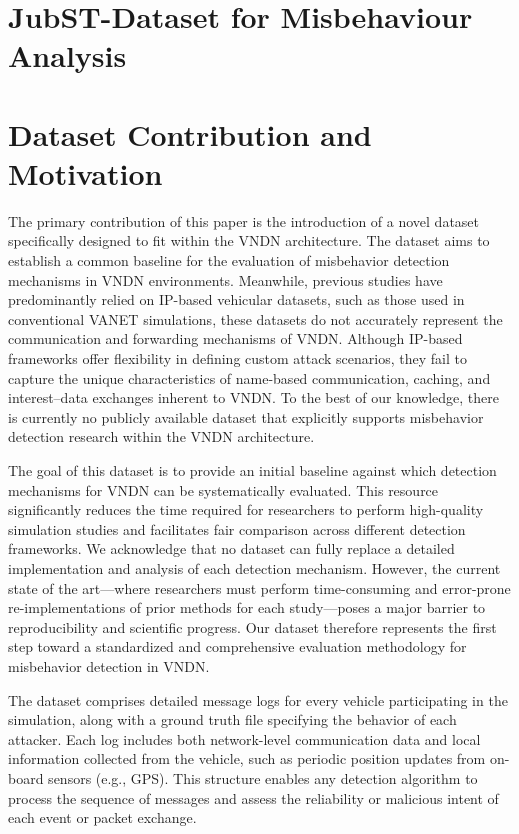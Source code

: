 \documentclass[journal,comsoc]{IEEEtran}
\begin{document}
\section{JubST-Dataset for Misbehaviour Analysis}
\section{Dataset Contribution and Motivation}

The primary contribution of this paper is the introduction of a novel dataset specifically designed to fit within the VNDN architecture. The dataset aims to establish a common baseline for the evaluation of misbehavior detection mechanisms in VNDN environments. Meanwhile, previous studies have predominantly relied on IP-based vehicular datasets, such as those used in conventional VANET simulations, these datasets do not accurately represent the communication and forwarding mechanisms of VNDN. Although IP-based frameworks offer flexibility in defining custom attack scenarios, they fail to capture the unique characteristics of name-based communication, caching, and interest–data exchanges inherent to VNDN. To the best of our knowledge, there is currently no publicly available dataset that explicitly supports misbehavior detection research within the VNDN architecture. 

The goal of this dataset is to provide an initial baseline against which detection mechanisms for VNDN can be systematically evaluated. This resource significantly reduces the time required for researchers to perform high-quality simulation studies and facilitates fair comparison across different detection frameworks. We acknowledge that no dataset can fully replace a detailed implementation and analysis of each detection mechanism. However, the current state of the art—where researchers must perform time-consuming and error-prone re-implementations of prior methods for each study—poses a major barrier to reproducibility and scientific progress. Our dataset therefore represents the first step toward a standardized and comprehensive evaluation methodology for misbehavior detection in VNDN.

The dataset comprises detailed message logs for every vehicle participating in the simulation, along with a ground truth file specifying the behavior of each attacker. Each log includes both network-level communication data and local information collected from the vehicle, such as periodic position updates from on-board sensors (e.g., GPS). This structure enables any detection algorithm to process the sequence of messages and assess the reliability or malicious intent of each event or packet exchange. 
\end{document}
